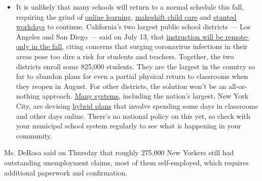 \begin{itemize}
  \begin{itemize}
  \tightlist
  \item
    It is unlikely that many schools will return to a normal schedule
    this fall, requiring the grind of
    \href{https://www.nytimes3xbfgragh.onion/2020/06/05/us/coronavirus-education-lost-learning.html?action=click\&pgtype=Article\&state=default\&region=MAIN_CONTENT_3\&context=storylines_faq}{online
    learning},
    \href{https://www.nytimes3xbfgragh.onion/2020/05/29/us/coronavirus-child-care-centers.html?action=click\&pgtype=Article\&state=default\&region=MAIN_CONTENT_3\&context=storylines_faq}{makeshift
    child care} and
    \href{https://www.nytimes3xbfgragh.onion/2020/06/03/business/economy/coronavirus-working-women.html?action=click\&pgtype=Article\&state=default\&region=MAIN_CONTENT_3\&context=storylines_faq}{stunted
    workdays} to continue. California's two largest public school
    districts --- Los Angeles and San Diego --- said on July 13, that
    \href{https://www.nytimes3xbfgragh.onion/2020/07/13/us/lausd-san-diego-school-reopening.html?action=click\&pgtype=Article\&state=default\&region=MAIN_CONTENT_3\&context=storylines_faq}{instruction
    will be remote-only in the fall}, citing concerns that surging
    coronavirus infections in their areas pose too dire a risk for
    students and teachers. Together, the two districts enroll some
    825,000 students. They are the largest in the country so far to
    abandon plans for even a partial physical return to classrooms when
    they reopen in August. For other districts, the solution won't be an
    all-or-nothing approach.
    \href{https://bioethics.jhu.edu/research-and-outreach/projects/eschool-initiative/school-policy-tracker/}{Many
    systems}, including the nation's largest, New York City, are
    devising
    \href{https://www.nytimes3xbfgragh.onion/2020/06/26/us/coronavirus-schools-reopen-fall.html?action=click\&pgtype=Article\&state=default\&region=MAIN_CONTENT_3\&context=storylines_faq}{hybrid
    plans} that involve spending some days in classrooms and other days
    online. There's no national policy on this yet, so check with your
    municipal school system regularly to see what is happening in your
    community.
  \end{itemize}
\end{itemize}

Ms. DeRosa said on Thursday that roughly 275,000 New Yorkers still had
outstanding unemployment claims, most of them self-employed, which
requires additional paperwork and confirmation.

